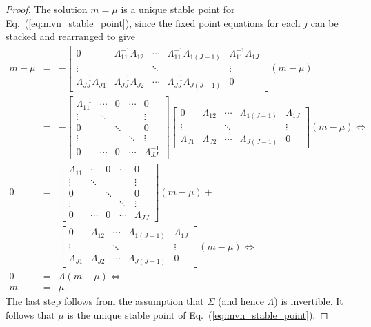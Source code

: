 \documentclass{article}\usepackage[]{graphicx}\usepackage[]{color}
\newcommand{\eq}[1]{Eq.~(\ref{eq:#1})}
\begin{document}
\begin{proof}
The solution $m = \mu$ is a unique stable point for \eq{mvn_stable_point}, since
the fixed point equations for each $j$ can be stacked and rearranged to give
%
\begin{eqnarray*}
m-\mu & = & -\left[\begin{array}{ccccc}
0 & \Lambda_{11}^{-1}\Lambda_{12} & \cdots & \Lambda_{11}^{-1}\Lambda_{1\left(J-1\right)} & \Lambda_{11}^{-1}\Lambda_{1J}\\
\vdots &  & \ddots &  & \vdots\\
\Lambda_{JJ}^{-1}\Lambda_{J1} & \Lambda_{JJ}^{-1}\Lambda_{J2} & \cdots & \Lambda_{JJ}^{-1}\Lambda_{J\left(J-1\right)} & 0
\end{array}\right]\left(m-\mu\right)\\
 & = & -\left[\begin{array}{ccccc}
\Lambda_{11}^{-1} & \cdots & 0 & \cdots & 0\\
\vdots & \ddots &  &  & \vdots\\
0 &  & \ddots &  & 0\\
\vdots &  &  & \ddots & \vdots\\
0 & \cdots & 0 & \cdots & \Lambda_{JJ}^{-1}
\end{array}\right]\left[\begin{array}{ccccc}
0 & \Lambda_{12} & \cdots & \Lambda_{1\left(J-1\right)} & \Lambda_{1J}\\
\vdots &  & \ddots &  & \vdots\\
\Lambda_{J1} & \Lambda_{J2} & \cdots & \Lambda_{J\left(J-1\right)} & 0
\end{array}\right]\left(m-\mu\right)\Leftrightarrow\\
0 & = & \left[\begin{array}{ccccc}
\Lambda_{11} & \cdots & 0 & \cdots & 0\\
\vdots & \ddots &  &  & \vdots\\
0 &  & \ddots &  & 0\\
\vdots &  &  & \ddots & \vdots\\
0 & \cdots & 0 & \cdots & \Lambda_{JJ}
\end{array}\right]\left(m-\mu\right) +\\
&& \left[\begin{array}{ccccc}
0 & \Lambda_{12} & \cdots & \Lambda_{1\left(J-1\right)} & \Lambda_{1J}\\
\vdots &  & \ddots &  & \vdots\\
\Lambda_{J1} & \Lambda_{J2} & \cdots & \Lambda_{J\left(J-1\right)} & 0
\end{array}\right]\left(m-\mu\right)\Leftrightarrow\\
0 & = & \Lambda \left(m-\mu\right) \Leftrightarrow\\
m & = & \mu.
\end{eqnarray*}
%
The last step follows from the assumption that $\Sigma$ (and hence $\Lambda$)
is invertible.  It follows that $\mu$ is the unique stable point of
\eq{mvn_stable_point}.

\end{proof}
\end{document}
